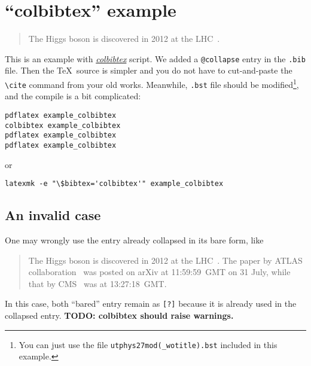 \documentclass{article}
\newcommand\TODO[1]{{\color{red} \textbf{TODO: #1}}}
\begin{document}
\section*{``colbibtex'' example}
\begin{quote}
The Higgs boson is discovered in 2012 at the LHC~\cite{HiggsDiscovery}.
\end{quote}

This is an example with \href{https://github.com/misho104/colbibtex}{\emph{colbibtex}} script.
We added a \texttt{@collapse} entry in the \texttt{.bib} file.
Then the \TeX\ source is simpler and you do not have to cut-and-paste the \texttt{\textbackslash cite} command from your old works.
Meanwhile, \texttt{.bst} file should be modified\footnote{%
  You can just use the file \texttt{utphys27mod(\_wotitle).bst} included in this example.
}, and the compile is a bit complicated:
\begin{lstlisting}
pdflatex example_colbibtex
colbibtex example_colbibtex
pdflatex example_colbibtex
pdflatex example_colbibtex
\end{lstlisting}
or
\begin{lstlisting}
latexmk -e "\$bibtex='colbibtex'" example_colbibtex
\end{lstlisting}

\subsection*{An invalid case}
One may wrongly use the entry already collapsed in its bare form, like
\begin{quote}
The Higgs boson is discovered in 2012 at the LHC~\cite{HiggsDiscovery}.
The paper by ATLAS collaboration~\cite{Aad:2012tfa} was posted on arXiv at 11:59:59~GMT on 31 July, while that by CMS~\cite{Chatrchyan:2012xdj} was at 13:27:18~GMT.
\end{quote}
In this case, both ``bared'' entry remain as \texttt{[?]} because it is already used in the collapsed entry.
\TODO{colbibtex should raise warnings.}

\end{document}
